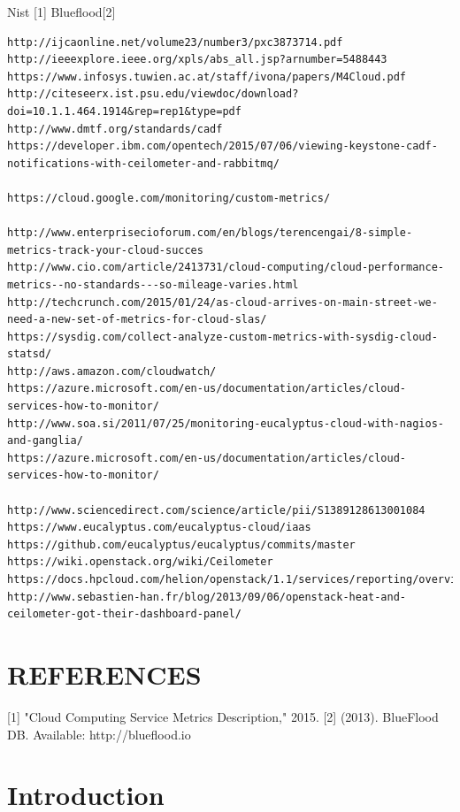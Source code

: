 \documentclass{sig-alternate-05-2015}
\begin{document}
Nist [1]
Blueflood[2]
\begin{verbatim}
http://ijcaonline.net/volume23/number3/pxc3873714.pdf
http://ieeexplore.ieee.org/xpls/abs_all.jsp?arnumber=5488443
https://www.infosys.tuwien.ac.at/staff/ivona/papers/M4Cloud.pdf
http://citeseerx.ist.psu.edu/viewdoc/download?doi=10.1.1.464.1914&rep=rep1&type=pdf
http://www.dmtf.org/standards/cadf
https://developer.ibm.com/opentech/2015/07/06/viewing-keystone-cadf-notifications-with-ceilometer-and-rabbitmq/

https://cloud.google.com/monitoring/custom-metrics/

http://www.enterprisecioforum.com/en/blogs/terencengai/8-simple-metrics-track-your-cloud-succes
http://www.cio.com/article/2413731/cloud-computing/cloud-performance-metrics--no-standards---so-mileage-varies.html
http://techcrunch.com/2015/01/24/as-cloud-arrives-on-main-street-we-need-a-new-set-of-metrics-for-cloud-slas/
https://sysdig.com/collect-analyze-custom-metrics-with-sysdig-cloud-statsd/
http://aws.amazon.com/cloudwatch/
https://azure.microsoft.com/en-us/documentation/articles/cloud-services-how-to-monitor/
http://www.soa.si/2011/07/25/monitoring-eucalyptus-cloud-with-nagios-and-ganglia/
https://azure.microsoft.com/en-us/documentation/articles/cloud-services-how-to-monitor/

http://www.sciencedirect.com/science/article/pii/S1389128613001084
https://www.eucalyptus.com/eucalyptus-cloud/iaas
https://github.com/eucalyptus/eucalyptus/commits/master
https://wiki.openstack.org/wiki/Ceilometer
https://docs.hpcloud.com/helion/openstack/1.1/services/reporting/overview/
http://www.sebastien-han.fr/blog/2013/09/06/openstack-heat-and-ceilometer-got-their-dashboard-panel/
\end{verbatim}





\section{REFERENCES}

[1]     "Cloud Computing Service Metrics Description," 2015.
[2]     (2013). BlueFlood DB. Available: http://blueflood.io



  
\section{Introduction} 
\end{document}
